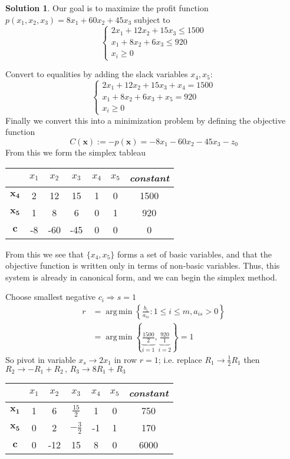 \documentclass[11pt]{article}
\theoremstyle{plain}
\theoremstyle{definition}
\newtheorem*{soln*}{Solution}
\numberwithin{equation}{section}
\DeclareMathOperator*{\argmin}{arg\,min}
\begin{document}
\begin{soln*} 
    Our goal is to maximize the profit function $p(x_1, x_2, x_3) = 8 x_1 + 60 x_2 + 45 x_3$ subject to
    \[
         \begin{cases}
             2 x_1 + 12 x_2 + 15 x_3 \le 1500 \\
             x_1 + 8 x_2 + 6 x_3 \le 920 \\
        x_i \ge 0 \end{cases}
    \]

Convert to equalities by adding the slack variables $x_4, x_5$:
    \[
         \begin{cases}
             2 x_1 + 12 x_2 + 15 x_3 + x_4 = 1500 \\
             x_1 + 8 x_2 + 6 x_3 + x_5 = 920 \\
        x_i \ge 0 \end{cases}
    \]
Finally we convert this into a minimization problem by defining the objective function
\[
        C(\bm{x}) := -p(\bm{x}) = - 8 x_1 - 60 x_2 - 45 x_3 - z_0 
    \]
From this we form the simplex tableau
\begin{tabu}{c|c|c|c|c|c|c}
    ~ & $x_1$ & $x_2$ & $x_3$ & $x_4$ & $x_5$ & \textit{constant} \\
    \hline
    $\bm{x_4}$ & 2 & 12 & 15 & 1 & 0 & 1500 \\
    $\bm{x_5}$ & 1 & 8 & 6 & 0 & 1 & 920 \\
    $\bm{c}$   & -8 & -60 & -45 & 0 & 0 & 0
\end{tabu}

From this we see that $\{x_4, x_5\}$ forms a set of basic variables, and that the objective function 
is written only in terms of non-basic variables. Thus, this system is already in canonical form,
and we can begin the simplex method.

Choose smallest negative $c_i \Rightarrow s = 1$
\begin{align*}
    r &= \argmin \left\{ \frac{b_i}{a_{is}} : 1 \le i \le m , a_{is} > 0 \right\}\\
      &= \argmin \left\{ \underbrace{\frac{1500}{2}}_{i=1} ,
                         \underbrace{\frac{920}{1}}_{i=2} \right\} = 1
\end{align*}
So pivot in variable $x_s \to 2x_1$ in row $r=1$; i.e. replace $R_1 \to \frac{1}{2} R_1$ then
$R_2 \to -R_1 + R_2 \,,\, R_3 \to 8R_1 + R_3 $
\begin{center}
\begin{tabu}{c|c|c|c|c|c|c}
    ~ & $x_1$ & $x_2$ & $x_3$ & $x_4$ & $x_5$ & \textit{constant} \\
    \hline
    $\bm{x_1}$ & 1 & 6 & $\frac{15}{2}$ & 1 & 0 & 750 \\
    $\bm{x_5}$ & 0 & 2 & $-\frac{3}{2}$ & -1 & 1 & 170 \\
    $\bm{c}$   & 0 & -12 & 15 & 8 & 0 & 6000
\end{tabu}
\end{center}


\end{soln*}
\end{document}
